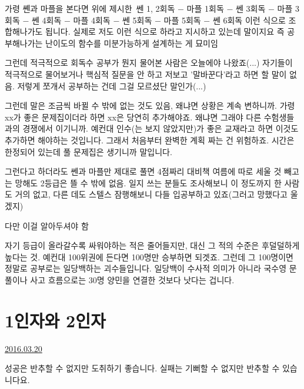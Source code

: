 가령 쏀과 마플을 본다면
위에 제시한 쎈 1, 2회독 $-$ 마플 1회독 $-$ 쎈 3회독 $-$ 마플 3회독 $-$ 쎈 4회독 $-$ 마플 4회독 $-$ 쎈 5회독 $-$ 마플 5회독 $-$ 쎈 6회독
이런 식으로 조합해나가도 됩니다. 실제로 저도 이런 식으로 하라고 지시하고 있는데 말이지요
즉 공부해나가는 난이도의 함수를 미분가능하게 설계하는 게 묘미임
\vspace{5mm}

그런데 적극적으로 회독수 공부가 뭔지 물어본 사람은 오늘에야 나왔죠(...)
자기들이 적극적으로 물어보거나 핵심적 질문을 안 하고 저보고 '말바꾼다'라고 하면 할 말이 없음.
저렇게 쪼개서 공부하는 건데 그걸 모르셨단 말인가(...)
\vspace{5mm}

그런데 말은 조금씩 바뀔 수 밖에 없는 것도 있음, 왜냐면 상황은 계속 변하니까.
가령 xx가 좋은 문제집이더라 하면 xx은 당연히 추가해야죠. 왜냐면 그래야 다른 수험생들과의 경쟁에서 이기니까.
예컨대 인수(는 보지 않았지만)가 좋은 교재라고 하면 이것도 추가하면 해야하는 것입니다.
그래서 처음부터 완벽한 계획 짜는 건 위험하죠. 시간은 한정되어 있는데 풀 문제집은 생기니까 말입니다.
\vspace{5mm}

그런다고 하더라도 쎈과 마플만 제대로 풀면 4점짜리 대비책 여름에 따로 세울 것 빼고는 망해도 2등급은 뜰 수 밖에 없음.
일지 쓰는 분들도 조사해보니 이 정도까지 한 사람도 거의 없고, 다른 데도 스텔스 잠행해보니 다들 입공부하고 있죠(그러고 망했다고 울겠지)
\vspace{5mm}

다만 이걸 알아두셔야 함
\vspace{5mm}

자기 등급이 올라갈수록 싸워야하는 적은 줄어들지만, 대신 그 적의 수준은 후덜덜하게 높다는 것.
예컨대 100위권에 든다면 100명만 승부하면 되겟죠. 그런데 그 100명이면 정말로 공부로는 일당백하는 괴수들입니다.
일당백이 수사적 의미가 아니라 국수영 문풀이나 사고 흐름으로는 30명 양민을 연결한 것보다 낫다는 겁니다.
\vspace{5mm}





\section{1인자와 2인자}
\href{https://www.kockoc.com/Apoc/684760}{2016.03.20}

\vspace{5mm}

성공은 반추할 수 없지만 도취하기 좋습니다.
실패는 기뻐할 수 없지만 반추할 수 있습니다요.
\vspace{5mm}

